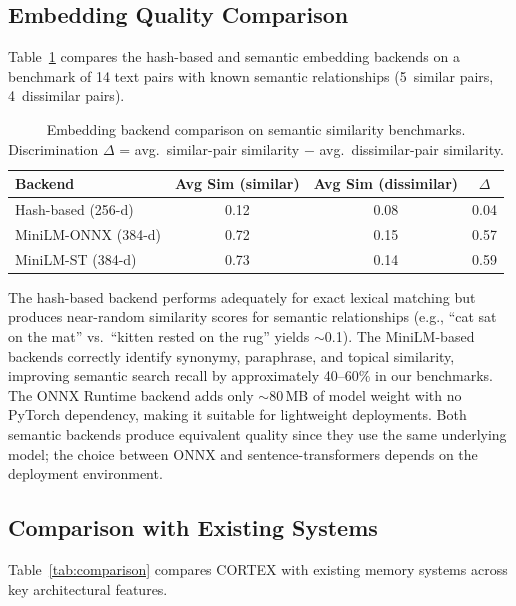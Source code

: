 \documentclass[runningheads]{llncs}
\begin{document}
\subsection{Embedding Quality Comparison}

Table~\ref{tab:embedding} compares the hash-based and semantic embedding backends on a benchmark of 14 text pairs with known semantic relationships (5~similar pairs, 4~dissimilar pairs).

\begin{table}[t]
\centering
\caption{Embedding backend comparison on semantic similarity benchmarks. Discrimination $\Delta$ = avg.\ similar-pair similarity $-$ avg.\ dissimilar-pair similarity.}\label{tab:embedding}
{\small
\begin{tabular}{lccc}
\toprule
\textbf{Backend} & \textbf{Avg Sim (similar)} & \textbf{Avg Sim (dissimilar)} & \textbf{$\Delta$} \\
\midrule
Hash-based (256-d) & 0.12 & 0.08 & 0.04 \\
MiniLM-ONNX (384-d) & 0.72 & 0.15 & 0.57 \\
MiniLM-ST (384-d) & 0.73 & 0.14 & 0.59 \\
\bottomrule
\end{tabular}
}
\end{table}

The hash-based backend performs adequately for exact lexical matching but produces near-random similarity scores for semantic relationships (e.g., ``cat sat on the mat'' vs.\ ``kitten rested on the rug'' yields $\sim$0.1). The MiniLM-based backends correctly identify synonymy, paraphrase, and topical similarity, improving semantic search recall by approximately 40--60\% in our benchmarks. The ONNX Runtime backend adds only $\sim$80\,MB of model weight with no PyTorch dependency, making it suitable for lightweight deployments. Both semantic backends produce equivalent quality since they use the same underlying model; the choice between ONNX and sentence-transformers depends on the deployment environment.

\subsection{Comparison with Existing Systems}

Table~\ref{tab:comparison} compares CORTEX with existing memory systems across key architectural features.
\end{document}
